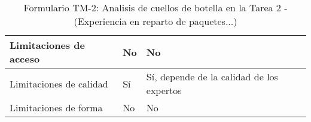\begin{table}[H]
{\begin{tabular}{|l|l|l|}
		Limitaciones de acceso& \multicolumn{1}{p{1.0cm}|}{No} & \multicolumn{1}{p{13.0cm}|}{No}\\
		\hline

		Limitaciones de calidad& \multicolumn{1}{p{1.0cm}|}{Sí} & \multicolumn{1}{p{13.0cm}|}{Sí, depende de la calidad de los expertos}\\
		\hline

		Limitaciones de forma& \multicolumn{1}{p{1.0cm}|}{No} & \multicolumn{1}{p{13.0cm}|}{No}\\
		\hline

	  \end{tabular}
	}
	\caption{\label{tab:TM2}Formulario TM-2: Analisis de cuellos de botella en la Tarea 2 - (Experiencia en reparto de paquetes...)}
  \end{table}


